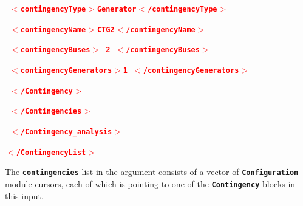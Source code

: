 \documentclass[12pt]{report} %
\begin{document}
\textcolor{red}{\texttt{\textbf{        $\boldsymbol{\mathrm{<}}$contingencyType$\boldsymbol{\mathrm{>}}$Generator$\boldsymbol{\mathrm{<}}$/contingencyType$\boldsymbol{\mathrm{>}}$}}}

\textcolor{red}{\texttt{\textbf{        $\boldsymbol{\mathrm{<}}$contingencyName$\boldsymbol{\mathrm{>}}$CTG2$\boldsymbol{\mathrm{<}}$/contingencyName$\boldsymbol{\mathrm{>}}$}}}

\textcolor{red}{\texttt{\textbf{        $\boldsymbol{\mathrm{<}}$contingencyBuses$\boldsymbol{\mathrm{>}}$ 2  $\boldsymbol{\mathrm{<}}$/contingencyBuses$\boldsymbol{\mathrm{>}}$}}}

\textcolor{red}{\texttt{\textbf{        $\boldsymbol{\mathrm{<}}$contingencyGenerators$\boldsymbol{\mathrm{>}}$1 $\boldsymbol{\mathrm{<}}$/contingencyGenerators$\boldsymbol{\mathrm{>}}$}}}

\textcolor{red}{\texttt{\textbf{      $\boldsymbol{\mathrm{<}}$/Contingency$\boldsymbol{\mathrm{>}}$}}}

\textcolor{red}{\texttt{\textbf{    $\boldsymbol{\mathrm{<}}$/Contingencies$\boldsymbol{\mathrm{>}}$}}}

\textcolor{red}{\texttt{\textbf{  $\boldsymbol{\mathrm{<}}$/Contingency\_analysis$\boldsymbol{\mathrm{>}}$}}}

\textcolor{red}{\texttt{\textbf{$\boldsymbol{\mathrm{<}}$/ContingencyList$\boldsymbol{\mathrm{>}}$}}}

The \texttt{\textbf{contingencies}} list in the argument consists of a vector of \texttt{\textbf{Configuration}} module cursors, each of which is pointing to one of the \texttt{\textbf{Contingency}} blocks in this input.
\end{document}
